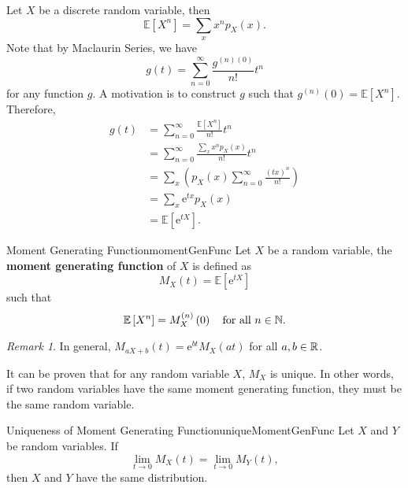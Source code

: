 \documentclass[math, code]{amznotes}
\theoremstyle{remark}
\newtheorem*{remark}{Remark}
\newcommand{\e}{\mathrm{e}}
\begin{document}
Let $X$ be a discrete random variable, then 
\begin{equation*}
    \mathbb{E}\left[X^n\right] = \sum_{x}x^np_X\left(x\right).
\end{equation*}
Note that by Maclaurin Series, we have
\begin{equation*}
    g\left(t\right) = \sum_{n = 0}^{\infty}\frac{g^{\left(n\right)\left(0\right)}}{n!}t^n
\end{equation*}
for any function $g$. A motivation is to construct $g$ such that $g^{\left(n\right)}\left(0\right) = \mathbb{E}\left[X^n\right]$. Therefore,
\begin{align*}
    g\left(t\right) & = \sum_{n = 0}^{\infty}\frac{\mathbb{E}\left[X^n\right]}{n!}t^n \\
    & = \sum_{n = 0}^{\infty}\frac{\sum_{x}x^np_X\left(x\right)}{n!}t^n \\
    & = \sum_{x}\left(p_X\left(x\right)\sum_{n = 0}^{\infty}\frac{\left(tx\right)^n}{n!}\right) \\
    & = \sum_{x}\e^{tx}p_X\left(x\right) \\
    & = \mathbb{E}\left[\e^{tX}\right].
\end{align*}
\begin{dfnbox}{Moment Generating Function}{momentGenFunc}
    Let $X$ be a random variable, the {\color{red} \textbf{moment generating function}} of $X$ is defined as 
    \begin{equation*}
        M_X\left(t\right) = \mathbb{E}\left[\e^{tX}\right]
    \end{equation*}
    such that 
    \begin{equation*}
        \mathbb{E}\left[X^n\right] = M_X^{\left(n\right)}\left(0\right) \quad\textrm{for all } n \in \mathbb{N}.
    \end{equation*}
\end{dfnbox}
\begin{notebox}
    \begin{remark}
        In general, $M_{aX + b}\left(t\right) = \e^{bt}M_X\left(at\right)$ for all $a, b \in \mathbb{R}$.
    \end{remark}
\end{notebox}
It can be proven that for any random variable $X$, $M_X$ is unique. In other words, if two random variables have the same moment generating function, they must be the same random variable.
\begin{thmbox}{Uniqueness of Moment Generating Function}{uniqueMomentGenFunc}
    Let $X$ and $Y$ be random variables. If
    \begin{equation*}
        \lim_{t \to 0}M_X\left(t\right) = \lim_{t \to 0}M_Y\left(t\right),
    \end{equation*}
    then $X$ and $Y$ have the same distribution.
\end{thmbox}
\end{document}
